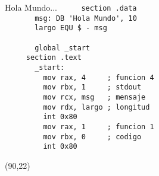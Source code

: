 \documentclass[aspectratio=169]{beamer}
\begin{document}
\begin{frame}[fragile]{Hola Mundo...}
    \verb|     section .data                  |\\ 
    \verb|       msg: DB 'Hola Mundo', 10     | \A \A \B \B \B \B \B \B \B \B \B \B \T \\
    \verb|       largo EQU $ - msg            |\\
    \verb|                                    |\\
    \verb|       global _start                |\\
    \verb|     section .text                  |\\
    \verb|       _start:                      |\\
    \verb|         mov rax, 4     ; funcion 4 | \A \A  \R \R \B \B \B \B \B \B \B \B \\
    \verb|         mov rbx, 1     ; stdout    | \A \A  \R \R \B \B \B \B \B \B \B \B \\
    \verb|         mov rcx, msg   ; mensaje   | \A \A  \R \R \B \B \B \B \B \B \B \B \\
    \verb|         mov rdx, largo ; longitud  | \A \A  \R \R \B \B \B \B \B \B \B \B \\
    \verb|         int 0x80                   | \A \A  \R \B \\
    \verb|         mov rax, 1     ; funcion 1 | \A \A  \R \R \B \B \B \B \B \B \B \B \\
    \verb|         mov rbx, 0     ; codigo    | \A \A  \R \R \B \B \B \B \B \B \B \B \\
    \verb|         int 0x80                   | \A \A  \R \B \\
    \begin{textblock}{70}(90,22)  \end{textblock}
\end{frame}
\end{document}
